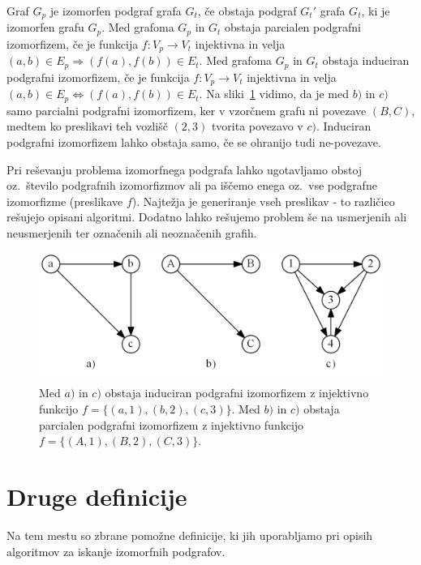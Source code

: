 \documentclass[a4paper, 12pt, ]{book}
\begin{document}
	Graf $G_p$ je izomorfen podgraf grafa $G_t$, če obstaja podgraf $G_t'$ grafa $G_t$, ki je izomorfen grafu $G_p$.
	Med grafoma $G_p$ in $G_t$ obstaja parcialen podgrafni izomorfizem, če je funkcija $f: V_p \to V_t$ injektivna in velja
	$(a,b) \in E_p \Rightarrow (f(a), f(b)) \in E_t$.
	Med grafoma $G_p$ in $G_t$ obstaja induciran podgrafni izomorfizem, če je funkcija $f: V_p \to V_t$ injektivna in velja
	$(a,b) \in E_p \Leftrightarrow (f(a), f(b)) \in E_t$. Na sliki~\ref{pic_sub_iso} vidimo, da je med $b)$ in $c)$ samo parcialni podgrafni
	izomorfizem, ker v vzorčnem grafu ni povezave $(B, C)$, medtem ko preslikavi teh vozlišč $(2, 3)$ tvorita povezavo v $c)$. Induciran 
	podgrafni izomorfizem lahko obstaja samo, če se ohranijo tudi ne-povezave.
	
	Pri reševanju problema izomorfnega podgrafa lahko ugotavljamo obstoj oz.~število podgrafnih izomorfizmov ali pa iščemo enega oz.~vse
	podgrafne izomorfizme (preslikave $f$). Najtežja je generiranje vseh preslikav - to različico rešujejo opisani algoritmi. Dodatno lahko rešujemo
	problem še na usmerjenih ali neusmerjenih ter označenih ali neoznačenih grafih.


	\begin{figure}
	\begin{center}
	\includegraphics[width=15cm]{img/graph_sub_izomorph.png}
	\end{center}
	\caption{Med $a)$ in $c)$ obstaja induciran podgrafni izomorfizem z injektivno funkcijo $f = \{(a, 1), (b, 2), (c, 3)\}$. Med $b)$ in $c)$ obstaja
	parcialen podgrafni izomorfizem z injektivno funkcijo $f = \{(A, 1), (B, 2), (C, 3)\}$.}
	\label{pic_sub_iso}
	\end{figure}



	\section{Druge definicije}

	Na tem mestu so zbrane pomožne definicije, ki jih uporabljamo pri opisih algoritmov za iskanje izomorfnih podgrafov.
\end{document}
